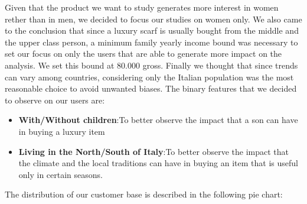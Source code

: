Given that the product we want to study generates more interest in women rether than in men, we decided to focus our studies on women only. We also came to the conclusion that since a luxury scarf is usually bought from the middle and the upper class person, a minimum family yearly income bound was necessary to set our focus on only the users that are able to generate more impact on the analysis. We set this bound at 80.000 \EUR{} gross. Finally we thought that since trends can vary among countries, considering only the Italian population was the most reasonable choice to avoid unwanted biases.
The binary features that we decided to observe on our users are:
\begin{itemize}
	\item \textbf{With/Without children}:\@ To better observe the impact that a son can have in buying a luxury item
	\item \textbf{Living in the North/South of Italy}:\@ To better observe the impact that the climate and the local traditions can have in buying an item that is useful only in certain seasons.
\end{itemize}
The distribution of our customer base is described in the following pie chart:
